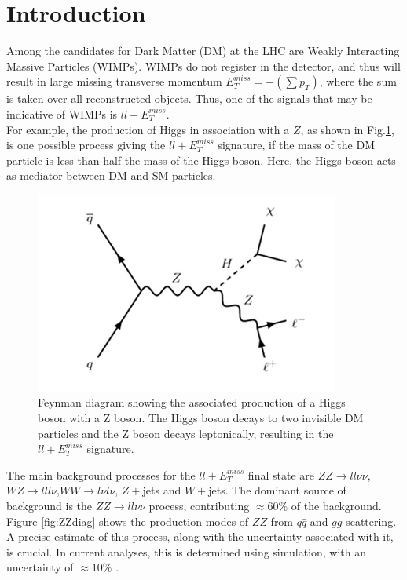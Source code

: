 \documentclass[11pt,a4paper,final]{report}
\begin{document}
\section{Introduction}
Among the candidates for Dark Matter (DM) at the LHC are Weakly Interacting Massive Particles (WIMPs). WIMPs do not register in the detector, and thus will result in large missing transverse momentum $E_T^{miss} = -(\sum p_T)$, where the sum is taken over all reconstructed objects. Thus, one of the signals that may be indicative of WIMPs is $ll+E_T^{miss}$.\\
For example, the production of Higgs in association with a $Z$, as shown in Fig.\ref{HZ}, is one possible process giving the $ll+E_T^{miss}$ signature, if the mass of the DM particle is less than half the mass of the Higgs boson. Here, the Higgs boson acts as mediator between DM and SM particles.
\begin{figure}[H]
	\begin{center}
		\includegraphics[scale=0.7]{HZ.png}
		\caption{Feynman diagram showing the associated production of a Higgs boson with a Z boson. The Higgs boson decays to two invisible DM particles and the Z boson decays leptonically, resulting in the $ll+ E_T^{miss}$ signature.}
		\label{HZ}
	\end{center}
\end{figure}
The main background processes for the $ll+E_T^{miss}$ final state are $ZZ\rightarrow ll\nu\nu$, $WZ\rightarrow lll\nu$,$WW\rightarrow l\nu l\nu$, $Z+$jets and $W+$jets. The dominant source of background is the $ZZ \rightarrow ll\nu\nu$ process, contributing $\approx 60 \%$ of the background. Figure \ref{fig:ZZdiag} shows the production modes of $ZZ$ from $q\bar{q}$ and $gg$ scattering.\\
A precise estimate of this process, along with the uncertainty associated with it, is crucial. In current analyses, this is determined using simulation, with an uncertainty of $\approx 10\%$ \cite{ZH_ATLAS}.
\end{document}
